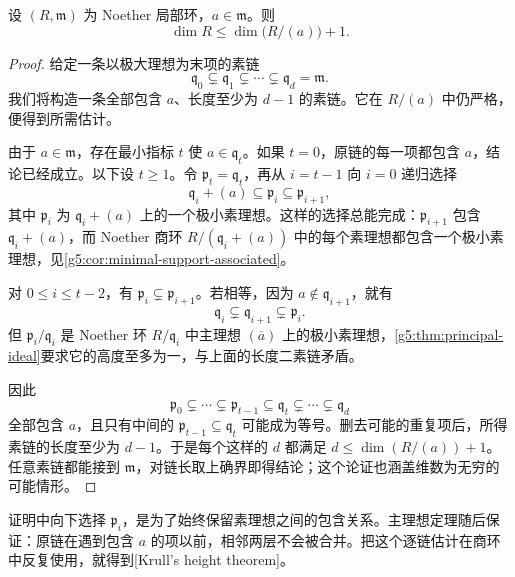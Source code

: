 \begin{lemma}\label{g5:lem:principal-dimension-drop}
	设 \((R,\mathfrak m)\) 为 Noether 局部环，\(a\in\mathfrak m\)。则
	\[
	\dim R\leq\dim\bigl(R/(a)\bigr)+1.
	\]
\end{lemma}
\begin{proof}
	给定一条以极大理想为末项的素链
	\[
	\mathfrak q_0\subsetneq\mathfrak q_1\subsetneq\cdots
	\subsetneq\mathfrak q_d=\mathfrak m.
	\]
	我们将构造一条全部包含 \(a\)、长度至少为 \(d-1\) 的素链。它在 \(R/(a)\) 中仍严格，便得到所需估计。

	由于 \(a\in\mathfrak m\)，存在最小指标 \(t\) 使 \(a\in\mathfrak q_t\)。如果 \(t=0\)，原链的每一项都包含 \(a\)，结论已经成立。以下设 \(t\geq1\)。令 \(\mathfrak p_t=\mathfrak q_t\)，再从 \(i=t-1\) 向 \(i=0\) 递归选择
	\[
	\mathfrak q_i+(a)\subseteq\mathfrak p_i
	\subseteq\mathfrak p_{i+1},
	\]
	其中 \(\mathfrak p_i\) 为 \(\mathfrak q_i+(a)\) 上的一个极小素理想。这样的选择总能完成：\(\mathfrak p_{i+1}\) 包含 \(\mathfrak q_i+(a)\)，而 Noether 商环 \(R/(\mathfrak q_i+(a))\) 中的每个素理想都包含一个极小素理想，见\cref{g5:cor:minimal-support-associated}。

	对 \(0\leq i\leq t-2\)，有 \(\mathfrak p_i\subsetneq\mathfrak p_{i+1}\)。若相等，因为 \(a\notin\mathfrak q_{i+1}\)，就有
	\[
	\mathfrak q_i\subsetneq\mathfrak q_{i+1}
	\subsetneq\mathfrak p_i.
	\]
	但 \(\mathfrak p_i/\mathfrak q_i\) 是 Noether 环 \(R/\mathfrak q_i\) 中主理想 \((\overline a)\) 上的极小素理想，\cref{g5:thm:principal-ideal}要求它的高度至多为一，与上面的长度二素链矛盾。

	因此
	\[
	\mathfrak p_0\subsetneq\cdots\subsetneq\mathfrak p_{t-1}
	\subseteq\mathfrak q_t\subsetneq\cdots\subsetneq\mathfrak q_d
	\]
	全部包含 \(a\)，且只有中间的 \(\mathfrak p_{t-1}\subseteq\mathfrak q_t\) 可能成为等号。删去可能的重复项后，所得素链的长度至少为 \(d-1\)。于是每个这样的 \(d\) 都满足
	\(d\leq\dim(R/(a))+1\)。任意素链都能接到 \(\mathfrak m\)，对链长取上确界即得结论；这个论证也涵盖维数为无穷的可能情形。
\end{proof}

证明中向下选择 \(\mathfrak p_i\)，是为了始终保留素理想之间的包含关系。主理想定理随后保证：原链在遇到包含 \(a\) 的项以前，相邻两层不会被合并。把这个逐链估计在商环中反复使用，就得到[Krull's height theorem]。

